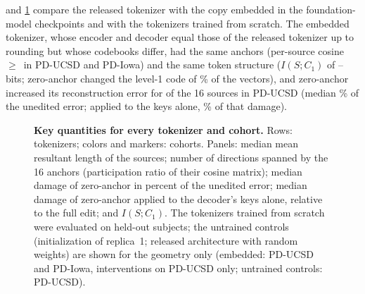 \documentclass[10pt,letterpaper]{article}
\begin{document}
 and \cref{fig:replication} compare the released tokenizer with the copy
embedded in the foundation-model checkpoints and with the tokenizers trained from scratch. The
embedded tokenizer, whose encoder and decoder equal those of the released tokenizer up to rounding
but whose codebooks differ, had the same anchors (per-source cosine $\geq$\,\EmbeddedAnchorCosMin{}
in PD-UCSD and PD-Iowa) and the same token structure ($I(S;C_1)$ of
\EmbMILevelOneMin--\EmbMILevelOneMax{} bits; zero-anchor changed the level-1 code of
\EmbFlipZeroLevelOne\% of the vectors), and zero-anchor increased its reconstruction error for
\EmbZeroAnchorPositiveCount{} of the 16 sources in PD-UCSD (median \EmbZeroAnchorRel\% of the
unedited error; applied to the keys alone, \EmbKeysZeroMedianPct\% of that damage).



\begin{figure}[!h]
\caption{{\bf Key quantities for every tokenizer and cohort.}
Rows: tokenizers; colors and markers: cohorts. Panels: median mean resultant length of the sources; number of directions spanned by the 16 anchors
(participation ratio of their cosine matrix); median damage of zero-anchor in percent of the
unedited error; median damage of zero-anchor applied to the decoder's keys alone, relative to the
full edit; and
$I(S;C_1)$. The tokenizers trained from scratch were evaluated on held-out subjects; the
untrained controls (initialization of replica~1; released architecture with random weights) are
shown for the geometry only (embedded: PD-UCSD and PD-Iowa, interventions on PD-UCSD only; untrained
controls: PD-UCSD).}
\label{fig:replication}
\end{figure}
\end{document}
